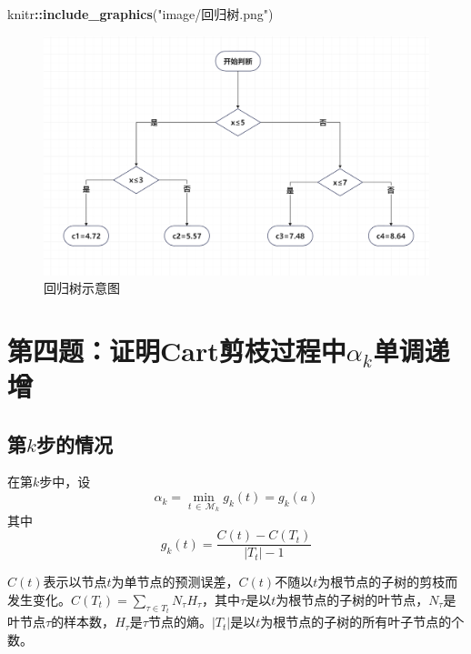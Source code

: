 \documentclass[
]{ctexart}
\newenvironment{Shaded}{\begin{snugshade}}{\end{snugshade}}
\newcommand{\FunctionTok}[1]{\textcolor[rgb]{0.13,0.29,0.53}{\textbf{#1}}}
\newcommand{\NormalTok}[1]{#1}
\newcommand{\SpecialCharTok}[1]{\textcolor[rgb]{0.81,0.36,0.00}{\textbf{#1}}}
\newcommand{\StringTok}[1]{\textcolor[rgb]{0.31,0.60,0.02}{#1}}
\begin{document}
\begin{Shaded}
\begin{Highlighting}[]
\NormalTok{ knitr}\SpecialCharTok{::}\FunctionTok{include\_graphics}\NormalTok{(}\StringTok{"image/回归树.png"}\NormalTok{)}
\end{Highlighting}
\end{Shaded}

\begin{figure}

{\centering \includegraphics[width=0.5\linewidth]{image/回归树} 

}

\caption{回归树示意图}\label{fig:unnamed-chunk-25}
\end{figure}

\hypertarget{ux7b2cux56dbux9898ux8bc1ux660ecartux526aux679dux8fc7ux7a0bux4e2dalpha_kux5355ux8c03ux9012ux589e}{%
\section{\texorpdfstring{第四题：证明Cart剪枝过程中\(\alpha_k\)单调递增}{第四题：证明Cart剪枝过程中\textbackslash alpha\_k单调递增}}\label{ux7b2cux56dbux9898ux8bc1ux660ecartux526aux679dux8fc7ux7a0bux4e2dalpha_kux5355ux8c03ux9012ux589e}}

\hypertarget{ux7b2ckux6b65ux7684ux60c5ux51b5}{%
\subsection{\texorpdfstring{第\(k\)步的情况}{第k步的情况}}\label{ux7b2ckux6b65ux7684ux60c5ux51b5}}

在第\(k\)步中，设 \[
\alpha_k = \mathop{\min}_{t\,\in \,\mathcal{M}_k} g_k(t) = g_k(a)
\] 其中 \[
g_k(t) = \frac{C(t)-C(T_t)}{|T_t|-1}
\]

\(C(t)\)表示以节点\(t\)为单节点的预测误差，\(C(t)\)不随以\(t\)为根节点的子树的剪枝而发生变化。\(C(T_t)=\sum_{\tau \in T_t} N_\tau H_\tau\)，其中\(\tau\)是以\(t\)为根节点的子树的叶节点，\(N_\tau\)是叶节点\(\tau\)的样本数，\(H_\tau\)是\(\tau\)节点的熵。\(|T_t|\)是以\(t\)为根节点的子树的所有叶子节点的个数。
\end{document}
